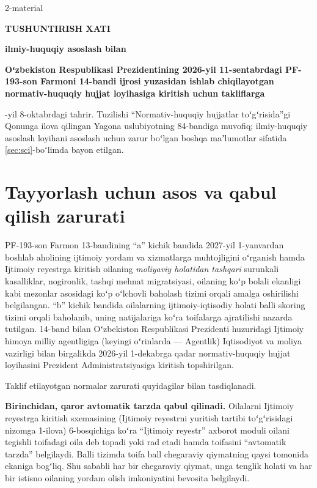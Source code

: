 \documentclass[14pt,a4paper]{extarticle}
\begin{document}
\begin{flushright}2-material\end{flushright}
\begin{center}\textbf{TUSHUNTIRISH XATI}\par
\textbf{ilmiy-huquqiy asoslash bilan}\par
\textbf{Oʻzbekiston Respublikasi Prezidentining 2026-yil 11-sentabrdagi PF-193-son Farmoni 14-bandi ijrosi yuzasidan ishlab chiqilayotgan normativ-huquqiy hujjat loyihasiga kiritish uchun takliflarga}\end{center}

-yil 8-oktabrdagi tahrir. Tuzilishi “Normativ-huquqiy hujjatlar toʻgʻrisida”gi Qonunga ilova qilingan Yagona uslubiyotning 84-bandiga muvofiq; ilmiy-huquqiy asoslash loyihani asoslash uchun zarur boʻlgan boshqa maʼlumotlar sifatida \ref{sec:sci}-boʻlimda bayon etilgan.

\section{Tayyorlash uchun asos va qabul qilish zarurati}\label{sec:basis}
PF-193-son Farmon 13-bandining “a” kichik bandida 2027-yil 1-yanvardan boshlab aholining ijtimoiy yordam va xizmatlarga muhtojligini oʻrganish hamda Ijtimoiy reyestrga kiritish oilaning \textit{moliyaviy holatidan tashqari} surunkali kasalliklar, nogironlik, tashqi mehnat migratsiyasi, oilaning koʻp bolali ekanligi kabi mezonlar asosidagi koʻp oʻlchovli baholash tizimi orqali amalga oshirilishi belgilangan. “b” kichik bandida oilalarning ijtimoiy-iqtisodiy holati balli skoring tizimi orqali baholanib, uning natijalariga koʻra toifalarga ajratilishi nazarda tutilgan. 14-band bilan Oʻzbekiston Respublikasi Prezidenti huzuridagi Ijtimoiy himoya milliy agentligiga (keyingi oʻrinlarda — Agentlik) Iqtisodiyot va moliya vazirligi bilan birgalikda 2026-yil 1-dekabrga qadar normativ-huquqiy hujjat loyihasini Prezident Administratsiyasiga kiritish topshirilgan\cite{pf193}.

Taklif etilayotgan normalar zarurati quyidagilar bilan tasdiqlanadi.

\textbf{Birinchidan, qaror avtomatik tarzda qabul qilinadi.} Oilalarni Ijtimoiy reyestrga kiritish sxemasining (Ijtimoiy reyestrni yuritish tartibi toʻgʻrisidagi nizomga 1-ilova) 6-bosqichiga koʻra “Ijtimoiy reyestr” axborot moduli oilani tegishli toifadagi oila deb topadi yoki rad etadi hamda toifasini “avtomatik tarzda” belgilaydi\cite{res35}. Balli tizimda toifa ball chegaraviy qiymatning qaysi tomonida ekaniga bogʻliq. Shu sababli har bir chegaraviy qiymat, unga tenglik holati va har bir istisno oilaning yordam olish imkoniyatini bevosita belgilaydi.
\end{document}
